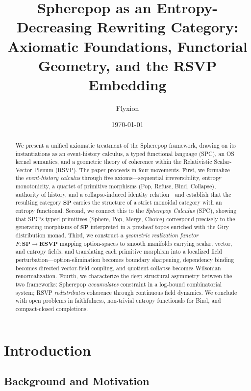 \documentclass[12pt, a4paper]{article}
\title{%
  \textbf{Spherepop as an Entropy-Decreasing Rewriting Category:\\
  Axiomatic Foundations, Functorial Geometry, and the RSVP Embedding}
}
\author{Flyxion}
\date{\today}
\theoremstyle{definition}
\theoremstyle{remark}
\newcommand{\SP}{\mathbf{SP}}
\newcommand{\RSVP}{\mathbf{RSVP}}
\begin{document}
\maketitle

\begin{abstract}
We present a unified axiomatic treatment of the Spherepop framework, drawing on its
instantiations as an event-history calculus, a typed functional language (SPC), an OS
kernel semantics, and a geometric theory of coherence within the Relativistic
Scalar-Vector Plenum (RSVP). The paper proceeds in four movements. First, we
formalize the \emph{event-history calculus} through five axioms—sequential
irreversibility, entropy monotonicity, a quartet of primitive morphisms (Pop, Refuse,
Bind, Collapse), authority of history, and a collapse-induced identity relation—and
establish that the resulting category $\SP$ carries the structure of a strict monoidal
category with an entropy functional. Second, we connect this to the \emph{Spherepop
Calculus} (SPC), showing that SPC's typed primitives (Sphere, Pop, Merge, Choice)
correspond precisely to the generating morphisms of $\SP$ interpreted in a presheaf
topos enriched with the Giry distribution monad. Third, we construct a
\emph{geometric realization functor} $F : \SP \to \RSVP$ mapping option-spaces to
smooth manifolds carrying scalar, vector, and entropy fields, and translating each
primitive morphism into a localized field perturbation—option-elimination becomes
boundary sharpening, dependency binding becomes directed vector-field coupling, and
quotient collapse becomes Wilsonian renormalization. Fourth, we characterize the deep
structural asymmetry between the two frameworks: Spherepop \emph{accumulates}
constraint in a log-bound combinatorial system; RSVP \emph{redistributes} coherence
through continuous field dynamics. We conclude with open problems in faithfulness,
non-trivial entropy functionals for Bind, and compact-closed completions.
\end{abstract}

\tableofcontents
\bigskip

\section{Introduction}
\label{sec:intro}

\subsection{Background and Motivation}
\end{document}
